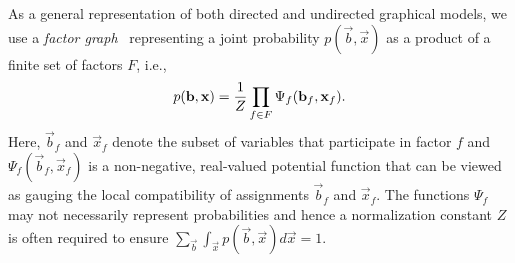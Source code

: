 \documentclass[letterpaper]{article}
\renewcommand{\-}{\text{-}}
\begin{document}
As a general representation of both directed and undirected graphical
models, we use a \emph{factor graph}~\cite{factor_graph} 
representing a joint probability $p(\vec{b},\vec{x})$ as a
product of a finite set of factors $F$, i.e.,
\vspace{-2mm}
{\footnotesize
\begin{equation}
p(\vec{b},\vec{x}) = \frac{1}{Z} \prod_{f \in F} \Psi_f(\vec{b}_f,\vec{x}_f).
\label{eq:fg}
\vspace{-1mm}
\end{equation}
}
Here, $\vec{b}_f$ and $\vec{x}_f$ denote the subset of variables that
participate in factor $f$ and $\Psi_f(\vec{b}_f,\vec{x}_f)$ is a 
non-negative, real-valued 
potential function that can be viewed as gauging the local
compatibility of assignments $\vec{b}_f$ and $\vec{x}_f$.  
The functions $\Psi_f$ may not necessarily represent probabilities and
hence a normalization constant $Z$ is often required to ensure
$\sum_{\vec{b}} \int_{\vec{x}} p(\vec{b},\vec{x}) d\vec{x} = 1$.
\end{document}
